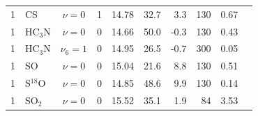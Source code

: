 \begin{table}[ph]
\begin{threeparttable}
\begin{tabular}{rlcccrrrrr}
1 & CS           & $\nu=0$      & 1 & 14.78 & 32.7 &    3.3 & 130 &  0.67 \\
1 & HC$_3$N      & $\nu=0$      & 0 & 14.66 & 50.0 &   -0.3 & 130 &  0.43 \\
1 & HC$_3$N      & $\nu_6=1$    & 0 & 14.95 & 26.5 &   -0.7 & 300 &  0.05 \\
1 & SO           & $\nu=0$      & 0 & 15.04 & 21.6 &    8.8 & 130 &  0.51 \\
1 & S$^{18}$O    & $\nu=0$      & 0 & 14.85 & 48.6 &    9.9 & 130 &  0.14 \\
1 & SO$_2$       & $\nu=0$      & 0 & 15.52 & 35.1 &    1.9 &  84 &  3.53 \\

\end{tabular}
\end{threeparttable}
\end{table}
